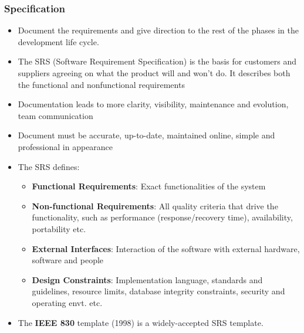 \documentclass{article}
\begin{document}
\subsubsection{Specification}
\begin{itemize}
    \item Document the requirements and give direction to the rest of the phases in the development life cycle.
    
    \item The SRS (Software Requirement Specification) is the basis for customers and suppliers agreeing on what the product will and won't do. It describes both the functional and nonfunctional requirements
    
    \item Documentation leads to more clarity, visibility, maintenance and evolution, team communication
    
    \item Document must be accurate, up-to-date, maintained online, simple and professional in appearance
    
    \item The SRS defines:
    \begin{itemize}
        \item \textbf{Functional Requirements}: Exact functionalities of the system
        
        \item \textbf{Non-functional Requirements}: All quality criteria that drive the functionality, such as performance (response/recovery time), availability, portability etc.
        
        \item \textbf{External Interfaces}: Interaction of the software with external hardware, software and people
        
        \item \textbf{Design Constraints}: Implementation language, standards and guidelines, resource limits, database integrity constraints, security and operating envt. etc. 
    \end{itemize}
    
    \item The \textbf{IEEE 830} template (1998) is a widely-accepted SRS template. 
\end{itemize}
\end{document}
